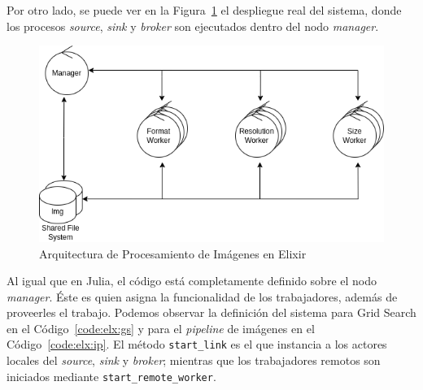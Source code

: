 \documentclass[11pt]{article}
\newcommand{\english}[1]{\textit{#1}}
\begin{document}
Por otro lado, se puede ver en la Figura~\ref{fig:elx:image_processing_arch} el despliegue real del sistema, donde los procesos \english{source}, \english{sink} y \english{broker} son ejecutados dentro del nodo \english{manager}.

\begin{figure}[ht]
    \centering
    \includegraphics[scale=0.4]{resources/distributed_systems/elixir/image_processing_arch.png}
    \caption{Arquitectura de Procesamiento de Imágenes en Elixir}
    \label{fig:elx:image_processing_arch}
\end{figure}

Al igual que en Julia, el código está completamente definido sobre el nodo \english{manager}. Éste es quien asigna la funcionalidad de los trabajadores, además de proveerles el trabajo. Podemos observar la definición del sistema para Grid Search en el Código~\ref{code:elx:gs} y para el \english{pipeline} de imágenes en el Código~\ref{code:elx:ip}. El método \lstinline{start_link} es el que instancia a los actores locales del \english{source}, \english{sink} y \english{broker}; mientras que los trabajadores remotos son iniciados mediante \lstinline{start_remote_worker}.
\end{document}
